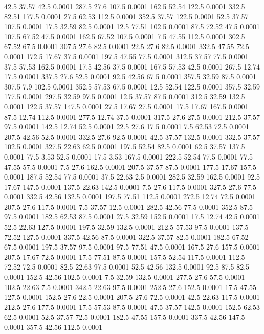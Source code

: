 42.5	37.57	42.5	0.0001
287.5	27.6	107.5	0.0001
162.5	52.54	122.5	0.0001
332.5	82.51	177.5	0.0001
27.5	62.53	112.5	0.0001
352.5	37.57	122.5	0.0001
52.5	37.57	107.5	0.0001
17.5	32.59	82.5	0.0001
12.5	77.51	102.5	0.0001
87.5	72.52	47.5	0.0001
107.5	67.52	47.5	0.0001
162.5	67.52	107.5	0.0001
7.5	47.55	112.5	0.0001
302.5	67.52	67.5	0.0001
307.5	27.6	82.5	0.0001
22.5	27.6	82.5	0.0001
332.5	47.55	72.5	0.0001
172.5	17.67	37.5	0.0001
197.5	47.55	77.5	0.0001
312.5	37.57	77.5	0.0001
37.5	57.53	162.5	0.0001
17.5	42.56	37.5	0.0001
167.5	57.53	42.5	0.0001
267.5	12.74	17.5	0.0001
337.5	27.6	52.5	0.0001
92.5	42.56	67.5	0.0001
357.5	32.59	87.5	0.0001
307.5	7.9	102.5	0.0001
352.5	57.53	67.5	0.0001
12.5	52.54	122.5	0.0001
357.5	32.59	177.5	0.0001
297.5	32.59	97.5	0.0001
12.5	37.57	87.5	0.0001
312.5	32.59	132.5	0.0001
122.5	37.57	147.5	0.0001
27.5	17.67	27.5	0.0001
17.5	17.67	167.5	0.0001
87.5	12.74	112.5	0.0001
277.5	12.74	37.5	0.0001
317.5	27.6	27.5	0.0001
212.5	37.57	97.5	0.0001
142.5	12.74	52.5	0.0001
22.5	27.6	17.5	0.0001
7.5	62.53	72.5	0.0001
207.5	42.56	52.5	0.0001
332.5	27.6	92.5	0.0001
42.5	37.57	132.5	0.0001
332.5	37.57	102.5	0.0001
327.5	22.63	62.5	0.0001
197.5	52.54	82.5	0.0001
62.5	37.57	137.5	0.0001
77.5	3.53	52.5	0.0001
17.5	3.53	167.5	0.0001
222.5	52.54	77.5	0.0001
77.5	47.55	57.5	0.0001
7.5	27.6	162.5	0.0001
207.5	37.57	87.5	0.0001
177.5	17.67	157.5	0.0001
187.5	52.54	77.5	0.0001
37.5	22.63	2.5	0.0001
282.5	32.59	162.5	0.0001
92.5	17.67	147.5	0.0001
137.5	22.63	142.5	0.0001
7.5	27.6	117.5	0.0001
327.5	27.6	77.5	0.0001
332.5	42.56	132.5	0.0001
197.5	77.51	112.5	0.0001
272.5	12.74	72.5	0.0001
207.5	27.6	117.5	0.0001
7.5	37.57	12.5	0.0001
282.5	42.56	77.5	0.0001
352.5	87.5	97.5	0.0001
182.5	62.53	87.5	0.0001
27.5	32.59	152.5	0.0001
17.5	12.74	42.5	0.0001
52.5	22.63	127.5	0.0001
197.5	32.59	132.5	0.0001
212.5	57.53	97.5	0.0001
137.5	72.52	127.5	0.0001
337.5	42.56	87.5	0.0001
322.5	37.57	82.5	0.0001
182.5	67.52	67.5	0.0001
197.5	37.57	97.5	0.0001
97.5	77.51	47.5	0.0001
167.5	27.6	157.5	0.0001
207.5	17.67	72.5	0.0001
17.5	77.51	87.5	0.0001
157.5	52.54	117.5	0.0001
112.5	72.52	72.5	0.0001
82.5	22.63	97.5	0.0001
52.5	42.56	132.5	0.0001
92.5	87.5	82.5	0.0001
152.5	42.56	102.5	0.0001
7.5	32.59	132.5	0.0001
277.5	27.6	57.5	0.0001
102.5	22.63	7.5	0.0001
342.5	22.63	97.5	0.0001
252.5	27.6	152.5	0.0001
17.5	47.55	127.5	0.0001
152.5	27.6	22.5	0.0001
207.5	27.6	72.5	0.0001
42.5	22.63	117.5	0.0001
212.5	27.6	177.5	0.0001
17.5	57.53	87.5	0.0001
47.5	37.57	142.5	0.0001
152.5	62.53	62.5	0.0001
52.5	37.57	72.5	0.0001
182.5	47.55	157.5	0.0001
337.5	42.56	147.5	0.0001
357.5	42.56	112.5	0.0001

